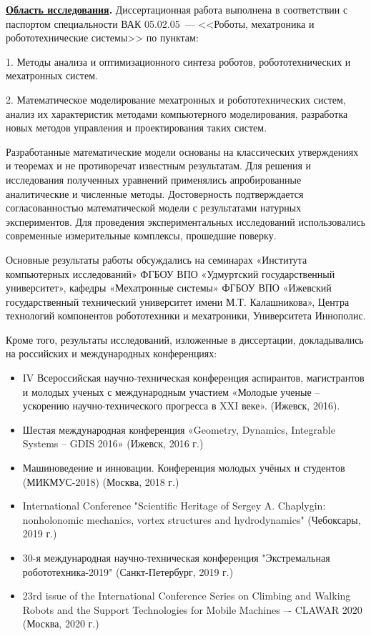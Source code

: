 \textbf{\underline{Область исследования}.} Диссертационная работа выполнена в соответствии с паспортом специальности ВАК 05.02.05~--- <<Роботы, мехатроника и робототехнические системы>> по пунктам: 

1. Методы анализа и оптимизационного синтеза роботов, робототехнических и мехатронных систем. 

2. Математическое моделирование мехатронных и робототехнических систем, анализ их характеристик методами компьютерного моделирования, разработка новых методов управления и проектирования таких систем.

{\reliability} Разработанные математические модели основаны на классических утверждениях и теоремах и не противоречат известным результатам. Для решения и исследования полученных уравнений применялись апробированные аналитические и численные методы. Достоверность подтверждается согласованностью математической модели с результатами натурных экспериментов. Для проведения экспериментальных исследований использовались современные измерительные комплексы, прошедшие поверку.


{\probation}
Основные результаты работы обсуждались на семинарах «Института компьютерных исследований» ФГБОУ ВПО «Удмуртский государственный университет», кафедры «Мехатронные системы» ФГБОУ ВПО «Ижевский государственный технический университет имени М.Т. Калашникова», Центра технологий компонентов робототехники и мехатроники, Университета Иннополис.

Кроме того, результаты исследований, изложенные в диссертации, докладывались на российских и международных конференциях:
\begin{itemize}
	\item IV Всероссийская научно-техническая конференция аспирантов, магистрантов и молодых ученых с международным участием «Молодые ученые -- ускорению научно-технического прогресса в XXI веке». (Ижевск, 2016).
	\item Шестая международная конференция «Geometry, Dynamics, Integrable Systems -- GDIS 2016» (Ижевск, 2016 г.)
	\item Машиноведение и инновации. Конференция молодых учёных и студентов (МИКМУС-2018) (Москва, 2018 г.)
	\item International Conference "Scientific Heritage of Sergey A. Chaplygin: nonholonomic mechanics, vortex structures and hydrodynamics" (Чебоксары, 2019 г.)
	\item 30-я международная научно-техническая конференция "Экстремальная робототехника-2019" (Санкт-Петербург, 2019 г.)	
	\item 23rd issue of the International Conference Series on Climbing and Walking Robots and the Support Technologies for Mobile Machines –- CLAWAR 2020 (Москва, 2020 г.)
\end{itemize}

